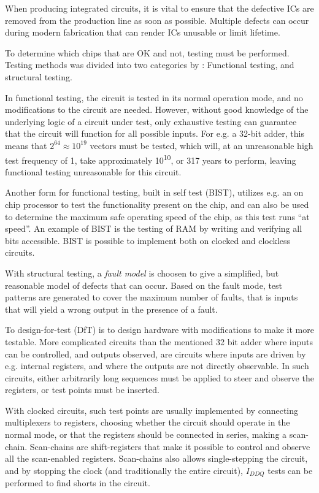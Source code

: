 When producing integrated circuits, it is vital to ensure that the
defective ICs are removed from the production line as soon as
possible. Multiple defects can occur during modern fabrication that
can render ICs unusable or limit lifetime.

To determine which chips that are OK and not, testing must be
performed. Testing methods was divided into two categories by
\cite{eldred}: Functional testing, and structural testing.

In functional testing, the circuit is tested in its normal operation
mode, and no modifications to the circuit are needed. However, without
good knowledge of the underlying logic of a circuit under test, only
exhaustive testing can guarantee that the circuit will function for
all possible inputs. For e.g. a 32-bit adder, this means that $2^{64}
\approx 10^{19}$ vectors must be tested, which will, at an
unreasonable high test frequency of \unit{1}{\giga \hertz}, take
approximately \unit{10^{10}}{\second}, or 317 years to perform,
leaving functional testing unreasonable for this circuit.

Another form for functional testing, built in self test
(BIST), utilizes e.g. an on
chip processor to test the functionality present on the chip, and can
also be used to determine the maximum safe operating speed of the
chip, as this test runs ``at speed''. An example of BIST is the
testing of RAM by writing and verifying all bits accessible. BIST is
possible to implement both on clocked and clockless circuits.

With structural testing, a \emph{fault model} is choosen to give a
simplified, but reasonable model of defects that can occur. Based on
the fault mode, test patterns are generated to cover the maximum
number of faults, that is inputs that will yield a wrong output in the
presence of a fault.

To design-for-test (DfT) is to
design hardware with modifications to make it more testable. More
complicated circuits than the mentioned 32 bit adder where inputs can
be controlled, and outputs observed, are circuits where inputs are
driven by e.g. internal registers, and where the outputs are not
directly observable. In such circuits, either arbitrarily long
sequences must be applied to steer and observe the registers, or test
points must be inserted.

With clocked circuits, such test points are usually implemented by
connecting multiplexers to registers, choosing whether the circuit
should operate in the normal mode, or that the registers should be
connected in series, making a scan-chain. Scan-chains are
shift-registers that make it possible to control and observe all the
scan-enabled registers. Scan-chains also allows single-stepping the
circuit, and by stopping the clock (and traditionally the entire
circuit), $I_{DDQ}$ tests can be performed to find shorts in the
circuit.

